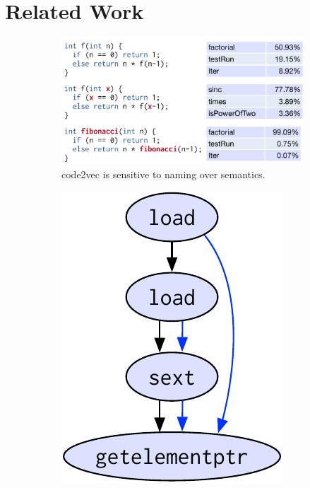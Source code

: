 \section{Related Work}

\begin{figure}[t]
  \centering
  \begin{subfigure}{.4\linewidth}
    \includegraphics[width=\linewidth]{images/code2vec.pdf}
    \caption{code2vec is sensitive to naming over semantics. }
    \label{subfig:code2vec}
  \end{subfigure}
  \hfill
  \begin{subfigure}{.15\linewidth}
    \vspace{1.5em}
    \includegraphics[width=.9\linewidth]{images/cdfg.pdf}

\end{subfigure}
\end{figure}
